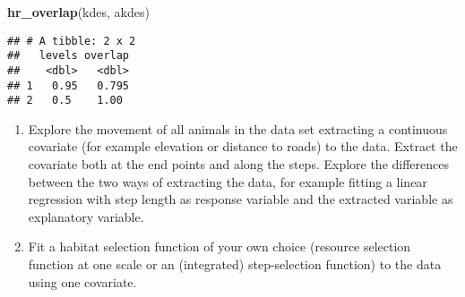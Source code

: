 \documentclass[
]{article}
\newenvironment{Shaded}{\begin{snugshade}}{\end{snugshade}}
\newcommand{\FunctionTok}[1]{\textcolor[rgb]{0.13,0.29,0.53}{\textbf{#1}}}
\newcommand{\NormalTok}[1]{#1}
\begin{document}
\begin{Shaded}
\begin{Highlighting}[]
\FunctionTok{hr\_overlap}\NormalTok{(kdes, akdes)}
\end{Highlighting}
\end{Shaded}

\begin{verbatim}
## # A tibble: 2 x 2
##   levels overlap
##    <dbl>   <dbl>
## 1   0.95   0.795
## 2   0.5    1.00
\end{verbatim}

\begin{enumerate}
\def\labelenumi{\arabic{enumi}.}
\setcounter{enumi}{2}
\item
  Explore the movement of all animals in the data set extracting a
  continuous covariate (for example elevation or distance to roads) to
  the data. Extract the covariate both at the end points and along the
  steps. Explore the differences between the two ways of extracting the
  data, for example fitting a linear regression with step length as
  response variable and the extracted variable as explanatory variable.
\item
  Fit a habitat selection function of your own choice (resource
  selection function at one scale or an (integrated) step-selection
  function) to the data using one covariate.
\end{enumerate}
\end{document}
